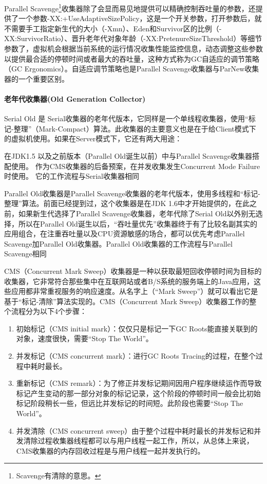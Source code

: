 \documentclass[../../../interview-questions.tex]{subfiles}
\begin{document}
Parallel Scavenge\footnote{Scavenge有清除的意思。}收集器除了会显而易见地提供可以精确控制吞吐量的参数，还提供了一个参数-XX:+UseAdaptiveSizePolicy，这是一个开关参数，打开参数后，就不需要手工指定新生代的大小（-Xmn）、Eden和Survivor区的比例（-XX:SurvivorRatio）、晋升老年代对象年龄（-XX:PretenureSizeThreshold）等细节参数了，虚拟机会根据当前系统的运行情况收集性能监控信息，动态调整这些参数以提供最合适的停顿时间或者最大的吞吐量，这种方式称为GC自适应的调节策略（GC Ergonomics）。自适应调节策略也是Parallel Scavenge收集器与ParNew收集器的一个重要区别。

\paragraph{老年代收集器(Old Generation Collector)}
Serial Old 是 Serial收集器的老年代版本，它同样是一个单线程收集器，使用“标记-整理”（Mark-Compact）算法。此收集器的主要意义也是在于给Client模式下的虚拟机使用。如果在Server模式下，它还有两大用途：

在JDK1.5 以及之前版本（Parallel Old诞生以前）中与Parallel Scavenge收集器搭配使用。
作为CMS收集器的后备预案，在并发收集发生Concurrent Mode Failure时使用。
它的工作流程与Serial收集器相同

Parallel Old收集器是Parallel Scavenge收集器的老年代版本，使用多线程和“标记-整理”算法。前面已经提到过，这个收集器是在JDK 1.6中才开始提供的，在此之前，如果新生代选择了Parallel Scavenge收集器，老年代除了Serial Old以外别无选择，所以在Parallel Old诞生以后，“吞吐量优先”收集器终于有了比较名副其实的应用组合，在注重吞吐量以及CPU资源敏感的场合，都可以优先考虑Parallel Scavenge加Parallel Old收集器。Parallel Old收集器的工作流程与Parallel Scavenge相同


CMS（Concurrent Mark Sweep）收集器是一种以获取最短回收停顿时间为目标的收集器，它非常符合那些集中在互联网站或者B/S系统的服务端上的Java应用，这些应用都非常重视服务的响应速度。从名字上（“Mark Sweep”）就可以看出它是基于“标记-清除”算法实现的。CMS（Concurrent Mark Sweep）收集器工作的整个流程分为以下4个步骤：

\begin{enumerate}
    \item {初始标记（CMS initial mark）：仅仅只是标记一下GC Roots能直接关联到的对象，速度很快，需要“Stop The World”。}
    \item {并发标记（CMS concurrent mark）：进行GC Roots Tracing的过程，在整个过程中耗时最长。}
    \item {重新标记（CMS remark）：为了修正并发标记期间因用户程序继续运作而导致标记产生变动的那一部分对象的标记记录，这个阶段的停顿时间一般会比初始标记阶段稍长一些，但远比并发标记的时间短。此阶段也需要“Stop The World”。}
    \item {并发清除（CMS concurrent sweep）由于整个过程中耗时最长的并发标记和并发清除过程收集器线程都可以与用户线程一起工作，所以，从总体上来说，CMS收集器的内存回收过程是与用户线程一起并发执行的。}
\end{enumerate}
\end{document}
